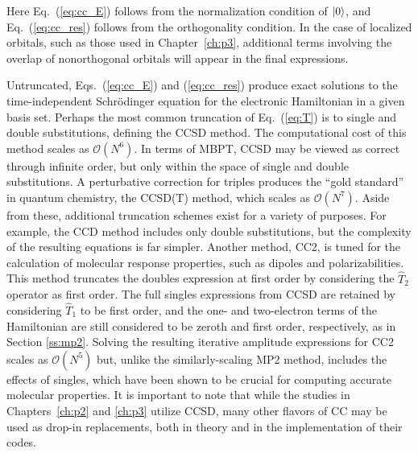 Here Eq.~(\ref{eq:cc_E}) follows from the normalization condition of $| 0 \rangle$, 
and Eq.~(\ref{eq:cc_res}) follows from the orthogonality condition. 
In the case of localized orbitals, such as those used in Chapter~\ref{ch:p3}, additional terms 
involving the overlap of nonorthogonal orbitals will appear in the final expressions. 

Untruncated, Eqs.~(\ref{eq:cc_E}) and (\ref{eq:cc_res}) produce exact
solutions to the time-independent Schr\"odinger equation for the
electronic Hamiltonian in a given basis set. Perhaps the most common
truncation of Eq.~(\ref{eq:T}) is to single and double substitutions,
defining the CCSD method. The computational cost of this method scales as
$\mathcal{O}(N^6)$. In terms of MBPT, CCSD may be viewed as correct through
infinite order, but only within the space of single and double substitutions.
A perturbative correction for triples produces the ``gold standard'' in
quantum chemistry, the CCSD(T) method, \cite{Raghavachari1989,Bartlett2005}
which scales as $\mathcal{O}(N^7)$. Aside from these, additional truncation
schemes exist for a variety of purposes. For example, the CCD method
includes only double substitutions, but the complexity of the resulting
equations is far simpler. Another method, CC2,\cite{Christiansen1995}
is tuned for the calculation of molecular response properties, such as
dipoles and polarizabilities. This method truncates the doubles expression
at first order by considering the $\hat{T}_2$ operator as first order. The
full singles expressions from CCSD are retained by considering $\hat{T}_1$
to be first order, and the one- and two-electron terms of the Hamiltonian are
still considered to be zeroth and first order, respectively, as in Section
\ref{ss:mp2}. Solving the resulting iterative amplitude expressions for CC2
scales as $\mathcal{O}(N^5)$ but, unlike the similarly-scaling MP2 method,
includes the effects of singles, which have been shown to be crucial for
computing accurate molecular properties.
\cite{Christiansen1995,Koch1997}
It is important to note that while the studies in Chapters~\ref{ch:p2} and \ref{ch:p3}
utilize CCSD, many other flavors of CC may be used as drop-in replacements,
both in theory and in the implementation of their codes.

